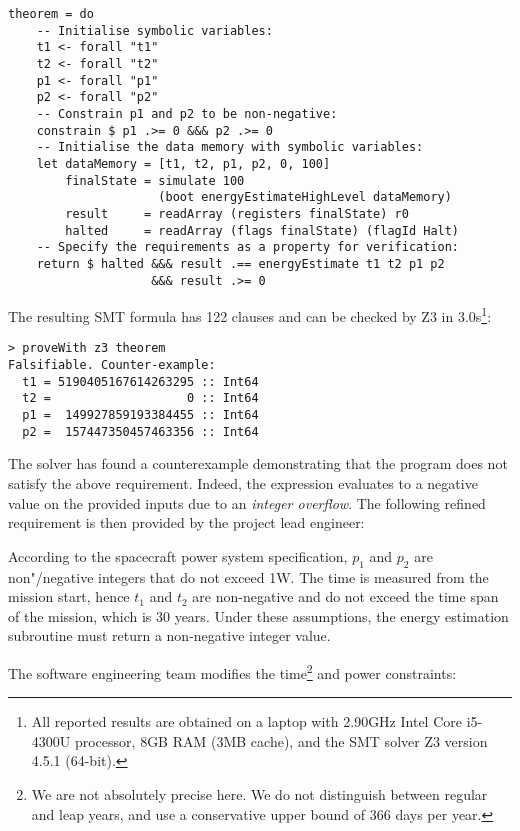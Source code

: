 \begin{verbatim}
theorem = do
    -- Initialise symbolic variables:
    t1 <- forall "t1"
    t2 <- forall "t2"
    p1 <- forall "p1"
    p2 <- forall "p2"
    -- Constrain p1 and p2 to be non-negative:
    constrain $ p1 .>= 0 &&& p2 .>= 0
    -- Initialise the data memory with symbolic variables:
    let dataMemory = [t1, t2, p1, p2, 0, 100]
        finalState = simulate 100
                     (boot energyEstimateHighLevel dataMemory)
        result     = readArray (registers finalState) r0
        halted     = readArray (flags finalState) (flagId Halt)
    -- Specify the requirements as a property for verification:
    return $ halted &&& result .== energyEstimate t1 t2 p1 p2
                    &&& result .>= 0
\end{verbatim}

\noindent
The resulting SMT formula has 122 clauses and can be checked by Z3 in
3.0s\footnote{All reported results are obtained on a laptop with 2.90GHz Intel
Core i5-4300U processor, 8GB RAM (3MB cache), and the SMT solver Z3 version 4.5.1 (64-bit).}:


\begin{verbatim}
> proveWith z3 theorem
Falsifiable. Counter-example:
  t1 = 5190405167614263295 :: Int64
  t2 =                   0 :: Int64
  p1 =  149927859193384455 :: Int64
  p2 =  157447350457463356 :: Int64
\end{verbatim}


The solver has found a counterexample demonstrating that the program does not
satisfy the above requirement. Indeed, the expression evaluates to a negative
value on the provided inputs due to an \emph{integer overflow}. The following
refined requirement is then provided by the project lead engineer:


\begin{tcolorbox}

According to the spacecraft power system specification, $p_1$ and $p_2$ are
non"/negative integers that do not exceed 1W. The time is measured
from the mission start, hence $t_1$ and $t_2$ are non-negative and do not exceed
the time span of the mission, which is 30 years. Under these assumptions,
the energy estimation subroutine must return a non-negative integer value.

\end{tcolorbox}

\noindent
The software engineering team modifies the time\footnote{We are not absolutely
precise here. We do not distinguish between regular and leap years, and use
a conservative upper bound of 366 days per year.} and power constraints:


